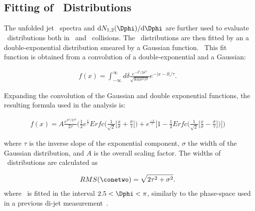 \subsection{ Fitting of \Dphi\ Distributions } \label{sec:fitting}

The unfolded jet \pT\ spectra and $\mathrm{d}N_{1,2}(\Dphi)/\mathrm{d}\Dphi$ are further used to evaluate \conetwo\ distributions both in \pp\ and \pPb\ collisions. The \conetwo\ distributions are then fitted by an a double-exponential distribution smeared by a Gaussian function.  This fit function is obtained from a convolution of a double-exponential and a Gaussian:

\begin{eqnarray}
f(x) = \int_{-\infty}^{\infty}d\delta\frac{e^{-\delta^{2}/2\sigma^{2}}}{\sqrt{8\pi\sigma^{2}\tau^{2}}}e^{-|x-\delta|/\tau}.
\end{eqnarray}

Expanding the convolution of the Gaussian and double exponential functions, the resulting formula used in the analysis is:

\begin{eqnarray}
f(x) = A\frac{e^{\sigma^2/2\tau^2}}{2\tau}\bigg(\frac{1}{2}e^{\frac{x}{\tau}}Erfc\bigg(\frac{1}{\sqrt{2}}\bigg[\frac{x}{\sigma}+\frac{\sigma}{\tau}\bigg]\bigg)+e^{\frac{-x}{\tau}}\bigg[1-\frac{1}{2}Erfc\bigg(\frac{1}{\sqrt{2}}\bigg[\frac{x}{\sigma}-\frac{\sigma}{\tau}\bigg]\bigg)\bigg]\bigg)
\end{eqnarray} 

where $\tau$ is the inverse slope of the exponential component, $\sigma$ the width of the Gaussian distribution, and $A$ is the overall scaling factor. The widths of \conetwo\ distributions are calculated as 

\begin{eqnarray}
RMS(\conetwo) =  \sqrt{2\tau^2 + \sigma^{2}}.
\end{eqnarray}
where \conetwo\ is fitted in the interval $2.5<\Dphi<\pi$, similarly to the phase-space used in a previous di-jet measurement~\cite{Chatrchyan:2014hqa}.


